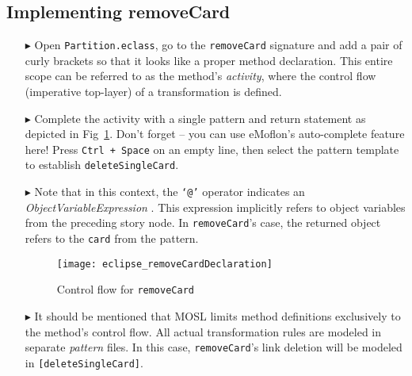 \newpage
\hypertarget{remCard tex}{}
\subsection{Implementing removeCard}
\texHeader

\begin{itemize}

\item[$\blacktriangleright$] Open \texttt{Partition.eclass}, go to the \texttt{removeCard} signature and add a pair of curly brackets so that it looks like a
proper method declaration. This entire scope can be referred to as the method's \emph{activity}, where the control flow (imperative top-layer) of a
transformation is defined.

\item[$\blacktriangleright$] Complete the activity with a single pattern and return statement as depicted in Fig~\ref{eclipse:remCardDec}. Don't forget -- you
can use eMoflon's auto-complete feature here! Press \texttt{Ctrl + Space} on an
empty line, then select the pattern template to establish \texttt{deleteSingleCard}.

\item[$\blacktriangleright$] Note that in this context, the \texttt{`@'} operator indicates an \emph{ObjectVariableExpression}%
. This expression implicitly refers to object variables from the preceding story node. In \texttt{removeCard}'s case, the
returned object refers to the \texttt{card} from the pattern.

\vspace{0.5cm}

\begin{figure}[htp]
\begin{center}
  \texttt{[image: eclipse\_removeCardDeclaration]}
  \caption{Control flow for \texttt{removeCard}}
  \label{eclipse:remCardDec}
\end{center}
\end{figure}

\item[$\blacktriangleright$] It should be mentioned that MOSL limits method definitions exclusively to the method's control flow. All actual transformation
rules are modeled in separate \emph{pattern} files. In this case, \texttt{removeCard}'s link deletion will be modeled in \texttt{[deleteSingleCard]}.

\vspace{0.5cm}


\end{itemize}
